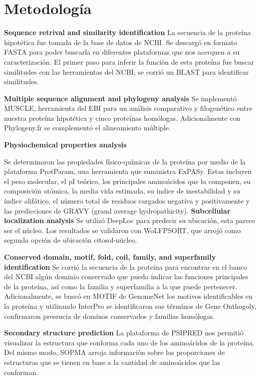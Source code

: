 \documentclass[journal,transmag]{IEEEtran}
\begin{document}
\section{Metodología}
 \textbf{ Sequence retrival and similarity identification}
 La secuencia de la proteína hipotética fue tomada de la base de datos de NCBI. Se descargó en formato FASTA para poder buscarla en diferentes plataformas que nos acerquen a su caracterización. El primer paso para inferir la función de esta proteína fue buscar similitudes con las herramientas del NCBI, se corrió un BLAST para identificar similitudes.

\textbf{ Multiple sequence alignment and phylogeny analysis}
Se implementó MUSCLE, herramienta del EBI para un análisis comparativo y filogenético entre nuestra proteína hipotética y cinco proteínas homólogas. Adicionalmente con Phylogeny.fr se complementó el alineamiento múltiple.

\textbf{ Physiochemical properties analysis}

Se determinaron las propiedades físico-químicas de la proteína por medio de la plataforma ProtParam, una herramienta que suministra ExPASy. Estas incluyen el peso molecular, el pI teórico, los principales aminoácidos que la componen, su composición atómica, la media vida estimada, su índice de inestabilidad y su índice alifático, el número total de residuos cargados negativa y positivamente y las predicciones de GRAVY (grand average hydropathicity).
\textbf{ Subcellular localization analysis}
Se utilizó DeepLoc para predecir su ubicación, esta parece ser el núcleo. Los resultados se validaron con WoLFPSORT, que arrojó como segunda opción de ubicación citosol-núcleo.

\textbf{ Conserved domain, motif, fold, coil, family, and superfamily identification}
Se corrió la secuencia de la proteína para encontrar en el banco del NCBI algún dominio conservado que pueda indicar las funciones principales de la proteína, así como la familia y superfamilia a la que puede pertenecer. Adicionalmente, se buscó en MOTIF de GenomeNet los motivos identificables en la proteína y utilizando InterPro se identificaron sus términos de Gene Onthogoly, confirmaron presencia de dominos conservados y familias homólogas.

\textbf{ Secondary structure prediction}
La plataforma de PSIPRED nos permitió visualizar la estructura que conforma cada uno de los aminoácidos de la proteína. Del mismo modo, SOPMA arroja información sobre las proporciones de estructuras que se tienen en base a la cantidad de aminoácidos que las conforman.
\end{document}
